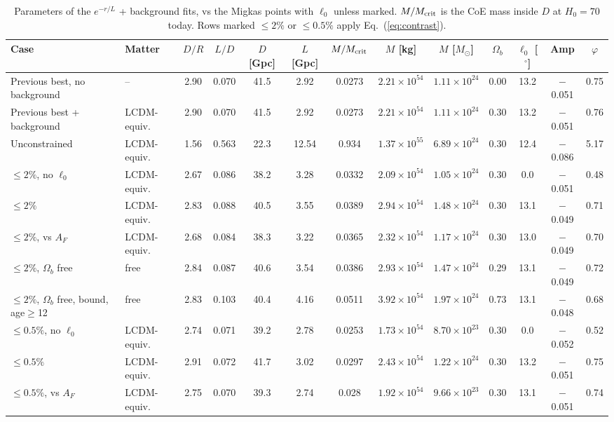 \documentclass[10pt,letterpaper]{article}
\begin{document}
\begin{table}[H]\centering\scriptsize\setlength{\tabcolsep}{2.4pt}
\caption{Parameters of the $e^{-r/L}$ + background fits, vs the Migkas points with $\ell_0$ unless marked. $M/M_{\rm crit}$ is the CoE mass inside $D$ at $H_0=70$ today. Rows marked $\le2\%$ or $\le0.5\%$ apply Eq.~(\ref{eq:contrast}).}\label{tab:par}
\begin{tabular}{llccccccccccc}\toprule
Case & Matter & $D/R$ & $L/D$ & $D$ [Gpc] & $L$ [Gpc] & $M/M_{\rm crit}$ & $M$ [kg] & $M$ [$M_\odot$] & $\Omega_b$ & $\ell_0$ [$^\circ$] & Amp & $\varphi$\\\midrule
Previous best, no background & -- & 2.90 & 0.070 & 41.5 & 2.92 & 0.0273 & $2.21\times10^{54}$ & $1.11\times10^{24}$ & 0.00 & 13.2 & $-$0.051 & 0.75\\
Previous best + background & LCDM-equiv. & 2.90 & 0.070 & 41.5 & 2.92 & 0.0273 & $2.21\times10^{54}$ & $1.11\times10^{24}$ & 0.30 & 13.2 & $-$0.051 & 0.76\\
Unconstrained & LCDM-equiv. & 1.56 & 0.563 & 22.3 & 12.54 & 0.934 & $1.37\times10^{55}$ & $6.89\times10^{24}$ & 0.30 & 12.4 & $-$0.086 & 5.17\\
$\le2\%$, no $\ell_0$ & LCDM-equiv. & 2.67 & 0.086 & 38.2 & 3.28 & 0.0332 & $2.09\times10^{54}$ & $1.05\times10^{24}$ & 0.30 & 0.0 & $-$0.051 & 0.48\\
$\le2\%$ & LCDM-equiv. & 2.83 & 0.088 & 40.5 & 3.55 & 0.0389 & $2.94\times10^{54}$ & $1.48\times10^{24}$ & 0.30 & 13.1 & $-$0.049 & 0.71\\
$\le2\%$, vs $A_F$ & LCDM-equiv. & 2.68 & 0.084 & 38.3 & 3.22 & 0.0365 & $2.32\times10^{54}$ & $1.17\times10^{24}$ & 0.30 & 13.0 & $-$0.049 & 0.70\\
$\le2\%$, $\Omega_b$ free & free & 2.84 & 0.087 & 40.6 & 3.54 & 0.0386 & $2.93\times10^{54}$ & $1.47\times10^{24}$ & 0.29 & 13.1 & $-$0.049 & 0.72\\
$\le2\%$, $\Omega_b$ free, bound, age$\ge$12 & free & 2.83 & 0.103 & 40.4 & 4.16 & 0.0511 & $3.92\times10^{54}$ & $1.97\times10^{24}$ & 0.73 & 13.1 & $-$0.048 & 0.68\\
$\le0.5\%$, no $\ell_0$ & LCDM-equiv. & 2.74 & 0.071 & 39.2 & 2.78 & 0.0253 & $1.73\times10^{54}$ & $8.70\times10^{23}$ & 0.30 & 0.0 & $-$0.052 & 0.52\\
$\le0.5\%$ & LCDM-equiv. & 2.91 & 0.072 & 41.7 & 3.02 & 0.0297 & $2.43\times10^{54}$ & $1.22\times10^{24}$ & 0.30 & 13.2 & $-$0.051 & 0.75\\
$\le0.5\%$, vs $A_F$ & LCDM-equiv. & 2.75 & 0.070 & 39.3 & 2.74 & 0.028 & $1.92\times10^{54}$ & $9.66\times10^{23}$ & 0.30 & 13.1 & $-$0.051 & 0.74\\

\end{tabular}
\end{table}
\end{document}
